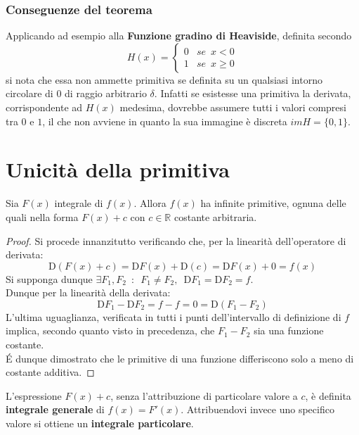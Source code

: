\documentclass[10pt, oneside]{book}
\theoremstyle{plain}
\begin{document}
\subsubsection{Conseguenze del teorema}
Applicando ad esempio alla \textbf{Funzione gradino di Heaviside}, definita secondo
\[H(x) = \begin{cases}
    0 & se \enspace x < 0\\
    1 & se \enspace x \geq 0
\end{cases}\]
si nota che essa non ammette primitiva se definita su un qualsiasi intorno circolare di $0$ di raggio arbitrario $\delta$. Infatti se esistesse una primitiva la derivata, corrispondente ad $H(x)$ medesima, dovrebbe assumere tutti i valori compresi tra $0$ e $1$, il che non avviene in quanto la sua immagine è discreta $im H = \{0,1\}$.

\section{Unicità della primitiva}
\begin{prop}
    Sia $F(x)$ integrale di $f(x)$. Allora $f(x)$ ha infinite primitive, ognuna delle quali nella forma $F(x) + c$ con $c \in \mathbb{R}$ costante arbitraria.
\end{prop}
\begin{proof}
    Si procede innanzitutto verificando che, per la linearità dell'operatore di derivata:
    \[\textrm{D}(F(x) + c) = \textrm{D}F(x) + \textrm{D}(c) = \textrm{D}F(x) + 0 = f(x) \]
    Si supponga dunque $\exists F_1, F_2 \enspace : \enspace F_1 \neq F_2, \enspace \textrm{D}F_1 = \textrm{D}F_2 = f$.
    \\Dunque per la linearità della derivata:
    \[\textrm{D}F_1 - \textrm{D}F_2 = f - f = 0 = \textrm{D}(F_1 - F_2)\]
    L'ultima uguaglianza, verificata in tutti i punti dell'intervallo di definizione di $f$ implica, secondo quanto visto in precedenza, che $F_1 - F_2$ sia una funzione costante. 
    \\\'E dunque dimostrato che le \hypertarget{primitive}{primitive di una funzione differiscono solo a meno di costante additiva.}
\end{proof}

\begin{defin}
    L'espressione $F(x) + c$, senza l'attribuzione di particolare valore a $c$, è definita \textbf{integrale generale} di $f(x) = F'(x)$. Attribuendovi invece uno specifico valore si ottiene un \textbf{integrale particolare}.
\end{defin}
\end{document}
